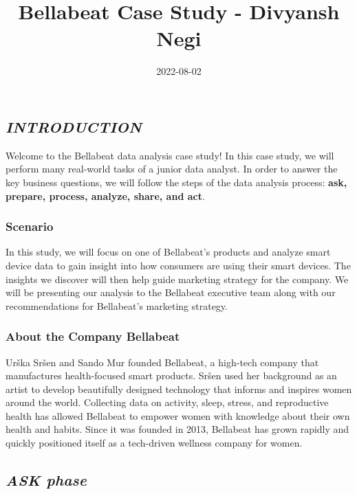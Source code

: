 \documentclass[
]{article}
\title{Bellabeat Case Study - Divyansh Negi}
\author{}
\date{2022-08-02}
\begin{document}
\maketitle

\hypertarget{introduction}{%
\subsection{\texorpdfstring{\textbf{\emph{INTRODUCTION}}}{INTRODUCTION}}\label{introduction}}

Welcome to the Bellabeat data analysis case study! In this case study,
we will perform many real-world tasks of a junior data analyst. In order
to answer the key business questions, we will follow the steps of the
data analysis process: \textbf{ask, prepare, process, analyze, share,
and act}.

\hypertarget{scenario}{%
\subsubsection{Scenario}\label{scenario}}

In this study, we will focus on one of Bellabeat's products and analyze
smart device data to gain insight into how consumers are using their
smart devices. The insights we discover will then help guide marketing
strategy for the company. We will be presenting our analysis to the
Bellabeat executive team along with our recommendations for Bellabeat's
marketing strategy.

\hypertarget{about-the-company-bellabeat}{%
\subsubsection{About the Company
Bellabeat}\label{about-the-company-bellabeat}}

Urška Sršen and Sando Mur founded Bellabeat, a high-tech company that
manufactures health-focused smart products. Sršen used her background as
an artist to develop beautifully designed technology that informs and
inspires women around the world. Collecting data on activity, sleep,
stress, and reproductive health has allowed Bellabeat to empower women
with knowledge about their own health and habits. Since it was founded
in 2013, Bellabeat has grown rapidly and quickly positioned itself as a
tech-driven wellness company for women.

\hypertarget{ask-phase}{%
\subsection{\texorpdfstring{\textbf{\emph{ASK
phase}}}{ASK phase}}\label{ask-phase}}
\end{document}
